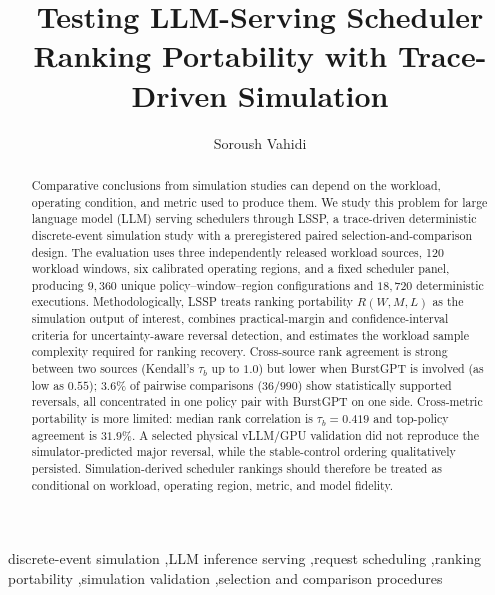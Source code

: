 \documentclass[preprint,12pt]{elsarticle}
\begin{document}
\begin{frontmatter}


\title{Testing LLM-Serving Scheduler Ranking Portability with Trace-Driven Simulation}

\author[inst1]{Soroush Vahidi}


\begin{abstract}
Comparative conclusions from simulation studies can depend on the workload,
operating condition, and metric used to produce them. We study this problem
for large language model (LLM) serving schedulers through LSSP, a
trace-driven deterministic discrete-event simulation study with a
preregistered paired selection-and-comparison design. The evaluation uses
three independently released workload sources, 120 workload windows, six
calibrated operating regions, and a fixed scheduler panel, producing
$9{,}360$ unique policy--window--region configurations and $18{,}720$
deterministic executions. Methodologically, LSSP treats ranking portability
$R(W,M,L)$ as the simulation output of interest, combines practical-margin
and confidence-interval criteria for uncertainty-aware reversal detection,
and estimates the workload sample complexity required for ranking recovery.
Cross-source rank agreement is strong between two sources (Kendall's
$\tau_b$ up to $1.0$) but lower when BurstGPT is involved (as low as
$0.55$); $3.6\%$ of pairwise comparisons ($36/990$) show statistically
supported reversals, all concentrated in one policy pair with BurstGPT on
one side. Cross-metric portability is more limited: median rank correlation
is $\tau_b=0.419$ and top-policy agreement is $31.9\%$. A selected physical
vLLM/GPU validation did not reproduce the simulator-predicted major
reversal, while the stable-control ordering qualitatively persisted.
Simulation-derived scheduler rankings should therefore be treated as
conditional on workload, operating region, metric, and model fidelity.
\end{abstract}

\begin{keyword}
discrete-event simulation \sep LLM inference serving \sep request scheduling \sep ranking portability \sep simulation validation \sep selection and comparison procedures
\end{keyword}

\end{frontmatter}

















\end{document}
